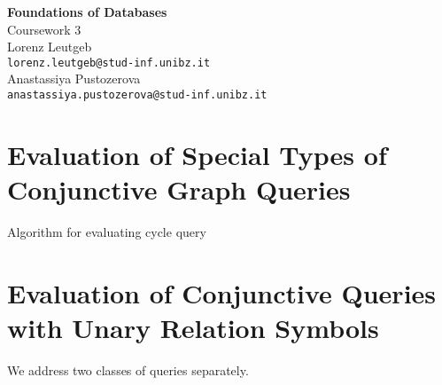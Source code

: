 \documentclass[a4paper,12pt]{article}
\begin{document}
\begin{center}
{\LARGE\bfseries Foundations of Databases}\\[3mm]

{\Large Coursework 3}\\[5mm]

Lorenz Leutgeb\\\texttt{lorenz.leutgeb@stud-inf.unibz.it}\\[2mm]
Anastassiya Pustozerova\\\texttt{anastassiya.pustozerova@stud-inf.unibz.it}
\end{center}

\section{Evaluation of Special Types of Conjunctive Graph Queries}
\begin{algorithm}
	\caption{Algorithm for evaluating cycle query}
\end{algorithm}


\section{Evaluation of Conjunctive Queries with Unary Relation Symbols}

We address two classes of queries separately.
\end{document}
